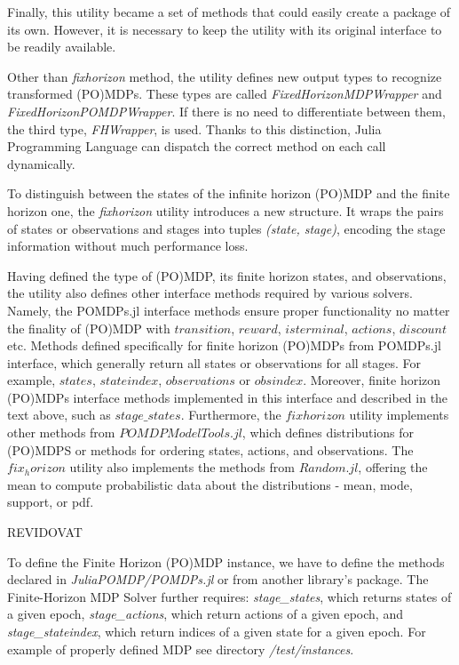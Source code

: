 Finally, this utility became a set of methods that could easily create a package of its own. However, it is necessary to keep the utility with its original interface to be readily available. 

Other than \textit{fixhorizon} method, the utility defines new output types to recognize transformed (PO)MDPs. These types are called \textit{FixedHorizonMDPWrapper} and \textit{FixedHorizonPOMDPWrapper}. If there is no need to differentiate between them, the third type, \textit{FHWrapper}, is used. Thanks to this distinction, Julia Programming Language can dispatch the correct method on each call dynamically.

To distinguish between the states of the infinite horizon (PO)MDP and the finite horizon one, the \textit{fixhorizon} utility introduces a new structure. It wraps the pairs of states or observations and stages into tuples \textit{(state, stage)}, encoding the stage information without much performance loss.

Having defined the type of (PO)MDP, its finite horizon states, and observations, the utility also defines other interface methods required by various solvers. Namely, the POMDPs.jl interface methods ensure proper functionality no matter the finality of (PO)MDP with $transition$, $reward$, $isterminal$, $actions$, $discount$ etc. Methods defined specifically for finite horizon (PO)MDPs from POMDPs.jl interface, which generally return all states or observations for all stages. For example, $states$, $stateindex$, $observations$ or $obsindex$. Moreover, finite horizon (PO)MDPs interface methods implemented in this interface and described in the text above, such as $stage\_states$. Furthermore, the $fixhorizon$ utility implements other methods from $POMDPModelTools.jl$, which defines distributions for (PO)MDPS or methods for ordering states, actions, and observations. The $fix_horizon$ utility also implements the methods from $Random.jl$, offering the mean to compute probabilistic data about the distributions - mean, mode, support, or pdf.




REVIDOVAT


To define the Finite Horizon (PO)MDP instance, we have to define the methods declared in \textit{JuliaPOMDP/POMDPs.jl} \cite{egorov2017pomdps} or from another library's package. The Finite-Horizon MDP Solver further requires: \textit{stage\_states}, which returns states of a given epoch, \textit{stage\_actions}, which return actions of a given epoch, and \textit{stage\_stateindex}, which return indices of a given state for a given epoch. For example of properly defined MDP see directory \textit{/test/instances}.

